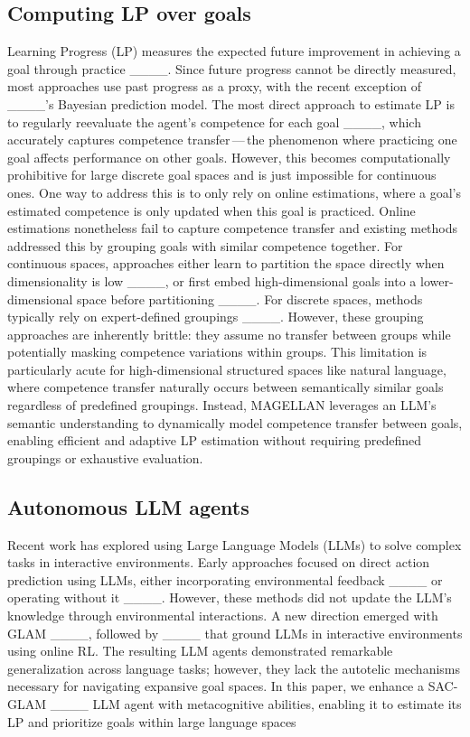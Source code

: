 \subsection{Computing LP over goals} \label{sec:related_work_lp}
Learning Progress (LP) measures the expected future improvement in achieving a goal through practice ____. Since future progress cannot be directly measured, most approaches use past progress as a proxy, with the recent exception of ____'s Bayesian prediction model. The most direct approach to estimate LP is to regularly reevaluate the agent's competence for each goal ____, which accurately captures competence transfer\,---\,the phenomenon where practicing one goal affects performance on other goals. However, this becomes computationally prohibitive for large discrete goal spaces and is just impossible for continuous ones. 
One way to address this is to only rely on online estimations, where a goal's estimated competence is only updated when this goal is practiced. Online estimations nonetheless fail to capture competence transfer and existing methods addressed this by grouping goals with similar competence together. For continuous spaces, approaches either learn to partition the space directly when dimensionality is low ____, or first embed high-dimensional goals into a lower-dimensional space before partitioning ____. For discrete spaces, methods typically rely on expert-defined groupings ____. However, these grouping approaches are inherently brittle: they assume no transfer between groups while potentially masking competence variations within groups. This limitation is particularly acute for high-dimensional structured spaces like natural language, where competence transfer naturally occurs between semantically similar goals regardless of predefined groupings. Instead, MAGELLAN leverages an LLM's semantic understanding to dynamically model competence transfer between goals, enabling efficient and adaptive LP estimation without requiring predefined groupings or exhaustive evaluation.

\subsection{Autonomous LLM agents}
Recent work has explored using Large Language Models (LLMs) to solve complex tasks in interactive environments. Early approaches focused on direct action prediction using LLMs, either incorporating environmental feedback ____ or operating without it ____. However, these methods did not update the LLM's knowledge through environmental interactions. A new direction emerged with GLAM ____, followed by ____ that ground LLMs in interactive environments using online RL. The resulting LLM agents demonstrated remarkable generalization across language tasks; however, they lack the autotelic mechanisms necessary for navigating expansive goal spaces. In this paper, we enhance a SAC-GLAM ____ LLM agent with metacognitive abilities, enabling it to estimate its LP and prioritize goals within large language spaces